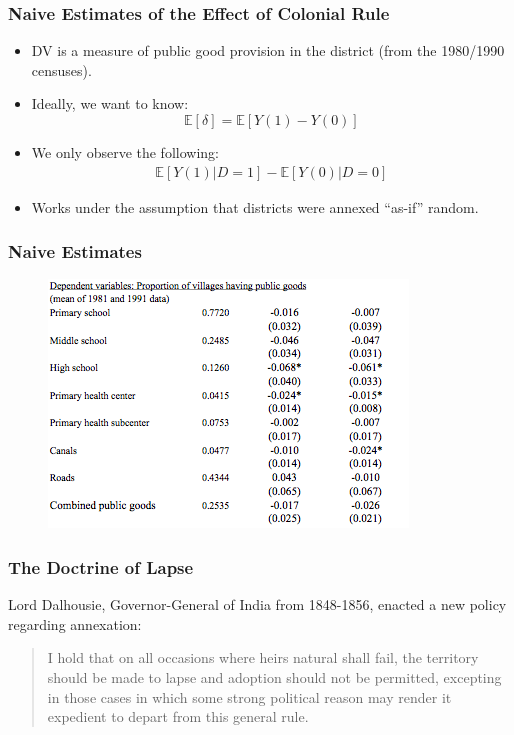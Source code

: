 \documentclass{beamer}
\begin{document}
\begin{frame}
  \frametitle{Naive Estimates of the Effect of Colonial Rule}
  \begin{itemize}
  \item DV is a measure of public good provision in the district (from
    the 1980/1990 censuses).
  \item Ideally, we want to know:
$$\mathbb{E}[\delta] =
\mathbb{E}[Y(1)-Y(0)]$$
\item We only observe the following:
\begin{eqnarray*}
\mathbb{E}[Y(1)|D=1] - \mathbb{E}[Y(0)|D=0]
\end{eqnarray*}
\item Works under the assumption that districts were annexed ``as-if''
  random.
 \end{itemize}
\end{frame}

 \begin{frame}
   \frametitle{Naive Estimates}
 \begin{figure}[t]
    \centering
      \includegraphics[scale=.8]{naive}
 \end{figure}
 \end{frame}

 \begin{frame}
   \frametitle{The Doctrine of Lapse}
   Lord Dalhousie, Governor-General of India from 1848-1856, enacted a
   new policy regarding annexation:
   \begin{quote}
     I hold that on all occasions where heirs natural shall fail, the territory should be made to lapse and adoption should not be permitted, excepting in those cases in which some strong political reason may render it expedient to depart from this general rule.
   \end{quote}
   \end{frame}
\end{document}
